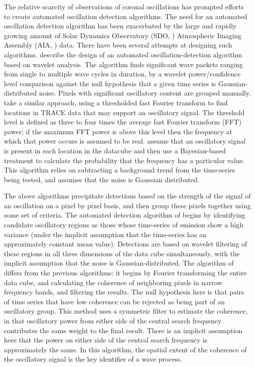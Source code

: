 \documentclass[onecolumn]{emulateapj}
\newcommand{\BF}{ }
\begin{document}
The relative scarcity of observations of coronal oscillations has
prompted efforts to create automated oscillation detection algorithms.
The need for an automated oscillation detection algorithm has been
exacerbated by the large and rapidly growing amount of {\BF Solar
  Dynamics Observatory (SDO, \citealp{2012SoPh..275....3P})
  Atmospheric Imaging Assembly (AIA, \citealp{2012SoPh..275...17L})}
data.  There have been several attempts at designing such algorithms.
\cite{2004SoPh..223....1D} describe the design of an automated
oscillation-detection algorithm based on wavelet analysis. The
algorithm finds significant wave packets ranging from single to
multiple wave cycles in duration, by a wavelet power/confidence level
comparison against the null hypothesis that a given time series is
Gaussian-distributed noise.  Pixels with significant oscillatory
content are grouped manually.  \cite{2007SoPh..241..397N} take a
similar approach, using a thresholded fast Fourier transform to find
locations in TRACE data that may support an oscillatory signal. The
threshold level is defined as three to four times the average fast
Fourier transform (FFT) power; if the maximum FFT power is above this
level then the frequency at which that power occurs is assumed to be
real. \cite{2010SoPh..264..403I} assume that an oscillatory signal is
present in each location in the datacube and then use a Bayesian-based
treatment to calculate the probability that the frequency has a
particular value.  This algorithm relies on subtracting a background
trend from the time-series being tested, and assumes that the noise is
Gaussian distributed.

The above algorithms precipitate detections based on the strength of
the signal of an oscillation on a pixel by pixel basis, and then group
these pixels together using some set of criteria.  The automated
detection algorithm of \cite{2008SoPh..248..395S} begins by
identifying candidate oscillatory regions as those whose time-series
of emission show a high variance \citep{2003SoPh..213..103G} (under
the implicit assumption that the time-series has an approximately
constant mean value).  Detections are based on wavelet filtering of
these regions in all three dimensions of the data cube simultaneously,
with the implicit assumption that the noise is Gaussian-distributed.
{\BF The algorithm of \cite{2008SoPh..252..321M} differs from the
  previous algorithms: it begins by Fourier transforming the entire
  data cube, and calculating the coherence of neighboring pixels in
  narrow frequency bands, and filtering the results. The null
  hypothesis here is that pairs of time series that have low coherence
  can be rejected as being part of an oscillatory group.  This method
  uses a symmetric filter to estimate the coherence, in that
  oscillatory power from either side of the central search frequency
  contributes the same weight to the final result.  There is an
  implicit assumption here that the power on either side of the
  central search frequency is approximately the same.  In this
  algorithm, the spatial extent of the coherence of the oscillatory
  signal is the key identifier of a wave process.}
\end{document}

